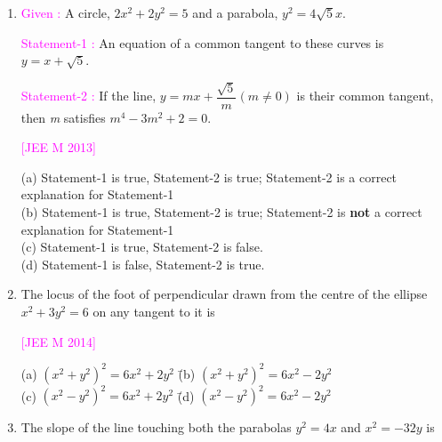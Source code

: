 \documentclass[journal,12pt,twocolumn]{IEEEtran}
\theoremstyle{remark}
\begin{document}
\begin{enumerate}[label=\textcolor{magenta}{\arabic*.}]
    \hfill{\textcolor{magenta}{[JEE M 2013]}}
    
    \begin{tabbing}
        (a) $x^2+y^2-6y-7=0$ \hspace{0em} \= (b) $x^2+y^2-6y+7=0$ \\
        (c) $x^2+y^2-6y-5=0$ \hspace{0em} \= (d) $x^2+y^2-6y+5=0$ \\
    \end{tabbing}
    \item
    \textcolor{magenta}{Given : }A circle, $2x^2+2y^2=5$ and a parabola, $y^2=4\sqrt{5}x$.
    
    \textcolor{magenta}{Statement-1 :} An equation of a common tangent to these curves is $y=x+\sqrt{5}$.
    
    \textcolor{magenta}{Statement-2 :} If the line, $y=mx+\dfrac{\sqrt{5}}{m} (m\neq0)$ is their common tangent, then \textit{m} satisfies $m^4-3m^2+2=0$.

    \hfill{\textcolor{magenta}{[JEE M 2013]}}
    
    (a) Statement-1 is true, Statement-2 is true; Statement-2
    is a correct explanation for Statement-1\\
    (b) Statement-1 is true, Statement-2 is true; Statement-2
    is \textbf{not} a correct explanation for Statement-1\\
    (c) Statement-1 is true, Statement-2 is false.\\
    (d) Statement-1 is false, Statement-2 is true.\\
    \item The locus of the foot of perpendicular drawn from the centre of the ellipse $x^2+3y^2=6$ on any tangent to it is
    
    \hfill{\textcolor{magenta}{[JEE M 2014]}}
    
    \begin{tabbing}
        (a) $(x^2+y^2)^2=6x^2+2y^2$ \hspace{0em} \= (b) $(x^2+y^2)^2=6x^2-2y^2$ \\
        (c) $(x^2-y^2)^2=6x^2+2y^2$ \hspace{0em} \= (d) $(x^2-y^2)^2=6x^2-2y^2$ \\
    \end{tabbing}

    \item The slope of the line touching both the parabolas $y^2=4x$ and $x^2=-32y$ is


\end{enumerate}
\end{document}
